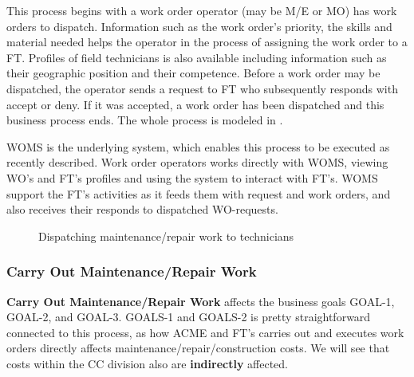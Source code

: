 This process begins with a work order operator (may be M/E or MO) has work orders to dispatch. Information such as the work order's priority, the skills and material needed helps the operator in the process of assigning the work order to a FT. Profiles of field technicians is also available including information such as their geographic position and their competence. Before a work order may be dispatched, the operator sends a request to FT who subsequently responds with accept or deny. If it was accepted, a work order has been dispatched and this business process ends. The whole process is modeled in .

WOMS is the underlying system, which enables this process to be executed as recently described. Work order operators works directly with WOMS, viewing WO's and FT's profiles and using the system to interact with FT's. WOMS support the FT's activities as it feeds them with request and work orders, and also receives their responds to dispatched WO-requests.
\begin{figure}[H]
	\centering
	\setlength\fboxsep{7pt}
	\setlength\fboxrule{0.5pt}
	\caption{Dispatching maintenance/repair work to technicians}
	\label{fig:dispatch}
\end{figure}
%
\subsubsection{Carry Out Maintenance/Repair Work}
\label{sec:bp4}
\textbf{Carry Out Maintenance/Repair Work} affects the business goals GOAL-1, GOAL-2, and GOAL-3. GOALS-1 and GOALS-2 is pretty straightforward connected to this process, as how ACME and FT's carries out and executes work orders directly affects maintenance/repair/construction costs. We will see that costs within the CC division also are \textbf{indirectly} affected.

